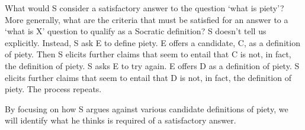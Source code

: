 \documentclass[oneside]{article}
\begin{document}

\noindent What would S consider a satisfactory answer to the question `what is piety'? More generally, what are the criteria that must be satisfied for an answer to a `what is X' question to qualify as a Socratic definition? S doesn't tell us explicitly. Instead,  S ask E to define piety. E offers a candidate, C, as a definition of piety. Then S elicits further claims that seem to entail that C is not, in fact, the definition of piety. S asks E to try again. E offers D as a definition of piety. S elicits further claims that seem to entail that D is not, in fact, the definition of piety. The process repeats. 

By focusing on how S argues against various candidate definitions of piety, we will identify what he thinks is required of a satisfactory answer. 
\end{document}

